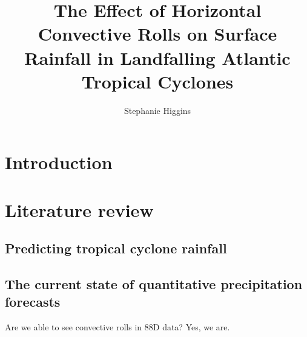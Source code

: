\documentclass[12pt]{article}
\author{Stephanie Higgins} \title{The Effect of Horizontal Convective Rolls on Surface Rainfall in Landfalling Atlantic Tropical Cyclones}
\begin{document}
\maketitle


\section{Introduction}

\section{Literature review}

\subsection{Predicting tropical cyclone rainfall} 

\subsection{The current state of quantitative precipitation forecasts}

Are we able to see convective rolls in 88D data?
Yes, we are.
\end{document}
